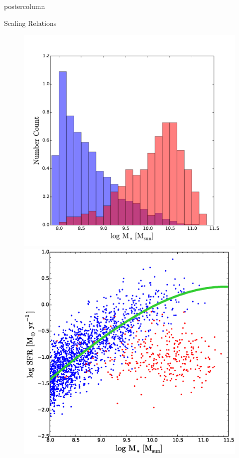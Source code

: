 \documentclass{beamer}
\begin{document}
\begin{frame}
\begin{columns}
\begin{column}{.5\textwidth}
\begin{beamercolorbox}[center,wd=\textwidth]{postercolumn}
\begin{minipage}[T]{.95\textwidth}
{\begin{myblock}{\LARGE Scaling Relations}
\begin{figure}
\begin{minipage}{0.32\textwidth}
								\centering\includegraphics[width=\textwidth]{img/Hist.pdf}
								\caption{}
							\end{minipage}
							\begin{minipage}{0.32\textwidth}
								\centering\includegraphics[width=\textwidth]{img/MSFR.eps}
								\caption{\cite{saintonge2016SFRMstar}}
							\end{minipage}
						\end{figure}


\end{myblock}}
\end{minipage}
\end{beamercolorbox}
\end{column}
\end{columns}
\end{frame}
\end{document}

